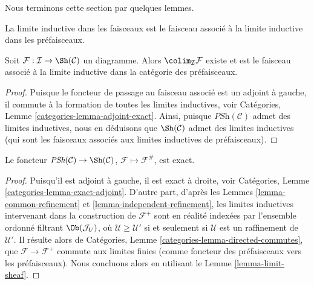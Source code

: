 \noindent
Nous terminons cette section par quelques lemmes.

\begin{lemma}
\label{lemma-colimit-sheaves}
\begin{slogan}
La limite inductive dans les faisceaux est le faisceau associé à la limite inductive dans les
préfaisceaux.
\end{slogan}
Soit $\mathcal{F} : \mathcal{I} \to \Sh(\mathcal{C})$
un diagramme. Alors $\colim_\mathcal{I} \mathcal{F}$ existe
et est le faisceau associé à la limite inductive dans la catégorie des préfaisceaux.
\end{lemma}

\begin{proof}
Puisque le foncteur de passage au faisceau associé est un adjoint à gauche, il commute
à la formation de toutes les limites inductives, voir Catégories,
Lemme \ref{categories-lemma-adjoint-exact}.
Ainsi, puisque $\textit{PSh}(\mathcal{C})$ admet des limites inductives, nous en déduisons
que $\Sh(\mathcal{C})$ admet des limites inductives (qui sont les
faisceaux associés aux limites inductives de préfaisceaux).
\end{proof}

\begin{lemma}
\label{lemma-sheafification-exact}
Le foncteur $\textit{PSh}(\mathcal{C}) \to \Sh(\mathcal{C})$,
$\mathcal{F} \mapsto \mathcal{F}^\#$, est exact.
\end{lemma}

\begin{proof}
Puisqu’il est adjoint à gauche, il est exact à droite, voir
Catégories, Lemme \ref{categories-lemma-exact-adjoint}.
D’autre part, d’après les Lemmes \ref{lemma-common-refinement}
et \ref{lemma-independent-refinement}, les limites inductives
intervenant dans la construction de $\mathcal{F}^+$ sont en réalité indexées par
l’ensemble ordonné filtrant $\Ob(\mathcal{J}_U)$, où
$\mathcal{U} \geq \mathcal{U}'$ si et seulement si
$\mathcal{U}$ est un raffinement de $\mathcal{U}'$. Il résulte alors de
Catégories, Lemme \ref{categories-lemma-directed-commutes},
que $\mathcal{F} \to \mathcal{F}^+$ commute
aux limites finies (comme foncteur des préfaisceaux vers les
préfaisceaux). Nous concluons alors en utilisant le
Lemme \ref{lemma-limit-sheaf}.
\end{proof}

